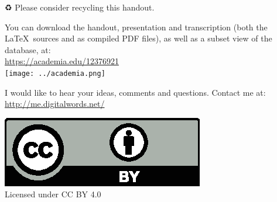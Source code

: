 \vfill


\begin{center}
\begin{extra}
	{♻} Please consider recycling this handout.
	
	You can download the handout, presentation and transcription (both the \LaTeX\ sources and as compiled PDF files), as well as a subset view of the database, at:\\
	\url{https://academia.edu/12376921}\\
	\texttt{[image: ../academia.png]}

	I would like to hear your ideas, comments and questions. Contact me at:\\
	\url{http://me.digitalwords.net/}

	\includegraphics[width=0.20\linewidth]{../cc-by.eps}\\
	Licensed under CC BY 4.0
\end{extra}
\end{center}
